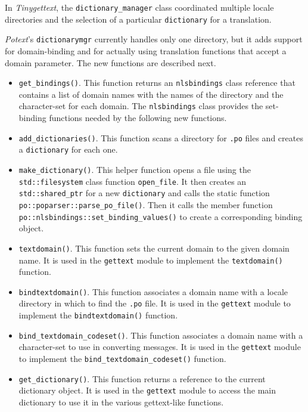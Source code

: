    In \textsl{Tinygettext}, the \texttt{dictionary\_manager} class 
   coordinated multiple locale directories and the selection of
   a particular \texttt{dictionary} for a translation.

   \textsl{Potext}'s \texttt{dictionarymgr}
   currently handles only one directory, but it
   adds support for domain-binding and for actually using translation
   functions that accept a domain parameter.
   The new functions are described next.

   \begin{itemize}
      \item \texttt{get\_bindings()}. This function returns an
         \texttt{nlsbindings} class reference that contains a list of domain
         names with the names of the directory and the character-set
         for each domain.
         The \texttt{nlsbindings} class provides the set-binding functions
         needed by the following new functions.
      \item \texttt{add\_dictionaries()}.
         This function scans a directory for \texttt{.po} files
         and creates a \texttt{dictionary} for each one.
      \item \texttt{make\_dictionary()}.
         This helper function opens a file using the \texttt{std::filesystem}
         class function \texttt{open\_file}.
         It then creates an \texttt{std::shared\_ptr} for a new
         \texttt{dictionary} and calls the static function
         \texttt{po::poparser::parse\_po\_file()}.
         Then it calls the member function
         \linebreak \texttt{po::nlsbindings::set\_binding\_values()}
         to create a corresponding binding object.
      \item \texttt{textdomain()}.
         This function sets the current domain to the given domain name.
         It is used in the \texttt{gettext} module to
         implement the \texttt{textdomain()} function.
      \item \texttt{bindtextdomain()}.
         This function associates a domain name with a locale directory
         in which to find the \texttt{.po} file.
         It is used in the \texttt{gettext} module to
         implement the \texttt{bindtextdomain()} function.
      \item \texttt{bind\_textdomain\_codeset()}.
         This function associates a domain name with a character-set to
         use in converting messages.
         It is used in the \texttt{gettext} module to
         implement the \texttt{bind\_textdomain\_codeset()} function.
      \item \texttt{get\_dictionary()}.
         This function returns a reference to the current dictionary
         object.
         It is used in the \texttt{gettext} module to access the main
         dictionary to use it in the various gettext-like functions.
   \end{itemize}

